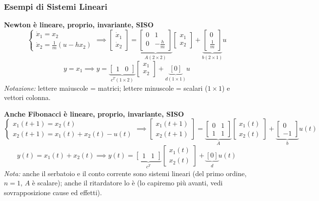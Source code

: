 \documentclass[11pt,a4paper]{article}
\begin{document}
\subsubsection{Esempi di Sistemi Lineari}
\textbf{Newton è lineare, proprio, invariante, SISO}
$$ \begin{cases} \dot{x}_1 = x_2 \\ \dot{x}_2 = \frac{1}{m}(u - hx_2) \end{cases} \implies \begin{bmatrix} \dot{x}_1 \\ \dot{x}_2 \end{bmatrix} = \underbrace{\begin{bmatrix} 0 & 1 \\ 0 & -\frac{h}{m} \end{bmatrix}}_{A(2\times2)} \begin{bmatrix} x_1 \\ x_2 \end{bmatrix} + \underbrace{\begin{bmatrix} 0 \\ \frac{1}{m} \end{bmatrix}}_{b(2\times1)} u $$
$$ y = x_1 \implies y = \underbrace{\begin{bmatrix} 1 & 0 \end{bmatrix}}_{c^T(1\times2)} \begin{bmatrix} x_1 \\ x_2 \end{bmatrix} + \underbrace{[0]}_{d(1\times1)} u $$
\textit{Notazione:} lettere maiuscole = matrici; lettere minuscole = scalari ($1\times1$) e vettori colonna.

\textbf{Anche Fibonacci è lineare, proprio, invariante, SISO}
$$ \begin{cases} x_1(t+1) = x_2(t) \\ x_2(t+1) = x_1(t) + x_2(t) - u(t) \end{cases} \implies \begin{bmatrix} x_1(t+1) \\ x_2(t+1) \end{bmatrix} = \underbrace{\begin{bmatrix} 0 & 1 \\ 1 & 1 \end{bmatrix}}_{A} \begin{bmatrix} x_1(t) \\ x_2(t) \end{bmatrix} + \underbrace{\begin{bmatrix} 0 \\ -1 \end{bmatrix}}_{b} u(t) $$
$$ y(t) = x_1(t) + x_2(t) \implies y(t) = \underbrace{\begin{bmatrix} 1 & 1 \end{bmatrix}}_{c^T} \begin{bmatrix} x_1(t) \\ x_2(t) \end{bmatrix} + \underbrace{[0]}_{d} u(t) $$
\textit{Nota:} anche il serbatoio e il conto corrente sono sistemi lineari (del primo ordine, $n=1$, $A$ è scalare); anche il ritardatore lo è (lo capiremo più avanti, vedi sovrapposizione cause ed effetti).
\end{document}
